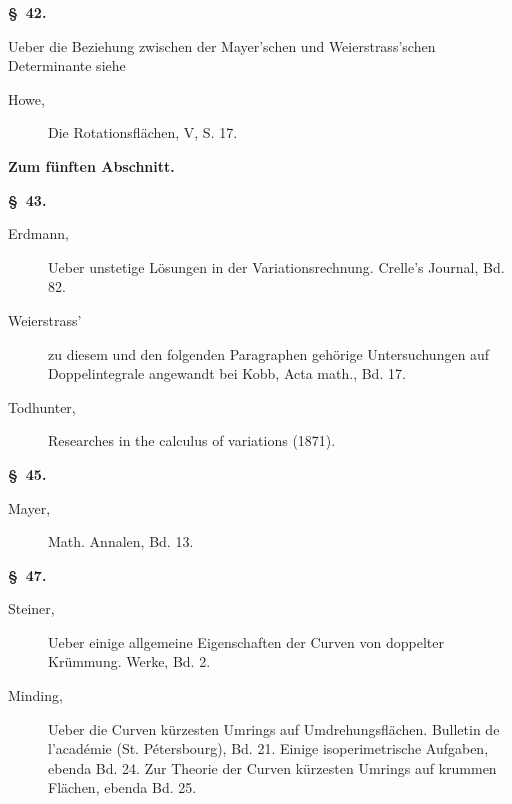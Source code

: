 \documentclass[11pt,a4paper,leqno]{article}
\begin{document}
\begin{center}{\bfseries \S~42.}\end{center}

\noindent Ueber die Beziehung zwischen der Mayer'schen und Weierstrass'schen
Determinante siehe

\begin{description}
\item[Howe,] Die Rotationsflächen, V, S. 17.
\end{description}

\begin{center}
{\large\bfseries Zum fünften Abschnitt.}

{\bfseries \S~43.}
\end{center}

\begin{description}
\item[Erdmann,] Ueber unstetige Lösungen in der Variationsrechnung. Crelle's
Journal, Bd. 82.

\item[Weierstrass'] zu diesem und den folgenden Paragraphen gehörige
Untersuchungen auf Doppelintegrale angewandt bei Kobb, Acta math., Bd. 17.

\item[Todhunter,] Researches in the calculus of variations (1871).
\end{description}

\begin{center}{\bfseries \S~45.}\end{center}

\begin{description}
\item[Mayer,] Math. Annalen, Bd. 13.
\end{description}

\begin{center}{\bfseries \S~47.}\end{center}

\begin{description}
\item[Steiner,] Ueber einige allgemeine Eigenschaften der Curven von doppelter
Krümmung. Werke, Bd. 2.

\item[Minding,] Ueber die Curven kürzesten Umrings auf Umdrehungsflächen.
Bulletin de l'académie (St. Pétersbourg), Bd. 21. Einige isoperimetrische
Aufgaben, ebenda Bd. 24. Zur Theorie der Curven kürzesten Umrings auf krummen
Flächen, ebenda Bd. 25.
\end{description}
\end{document}
